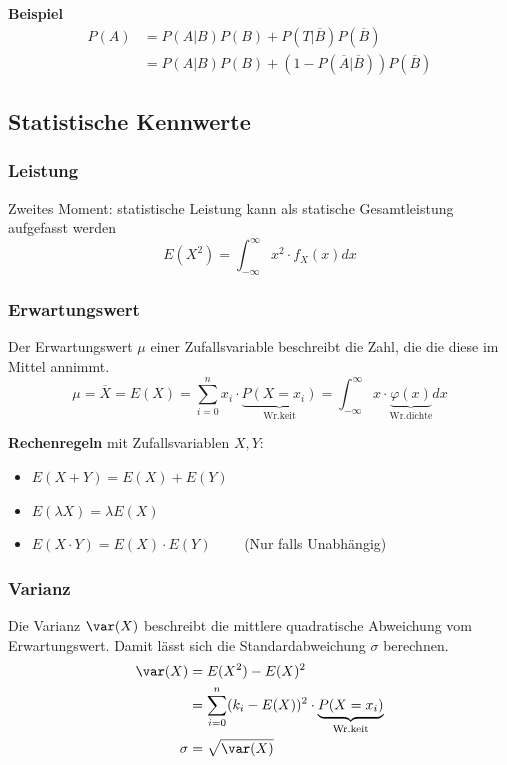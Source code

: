 \noindent\textbf{Beispiel}
\begin{align*}
	P(A) &=P(A|B)P(B) + P(T|\overline{B})P(\overline{B}) \\
	&= P(A|B)P(B) + (1 - P(\overline{A}|\overline{B}))P(\overline{B})
\end{align*}

\subsection{Statistische Kennwerte}
\subsubsection{Leistung}
Zweites Moment: statistische Leistung kann als statische Gesamtleistung aufgefasst werden
\[
E(X^2) = \int_{-\infty}^{\infty}x^2\cdot f_X(x)dx
\]

\subsubsection{Erwartungswert}
Der Erwartungswert $\mu$ einer Zufallsvariable beschreibt die Zahl, die die diese im Mittel annimmt.
\[
\mu = \overline{X} = E(X)= \sum\limits_{i=0}^{n}x_i\cdot \underbrace{P(X=x_i)}_\text{Wr.keit} = \int_{-\infty}^{\infty}x\cdot \underbrace{\varphi(x)}_{\text{Wr.dichte}}dx
\]

\textbf{Rechenregeln} mit Zufallsvariablen $X, Y$:
\begin{itemize}[nosep]
	\item $E(X + Y) = E(X) + E(Y)$
	\item $E(\lambda X) = \lambda E(X)$ 
	\item $E(X\cdot Y) = E(X) \cdot E(Y) \qquad$  (Nur falls Unabhängig)
\end{itemize}

\subsubsection{Varianz}
Die Varianz $\var(X)$ beschreibt die mittlere quadratische Abweichung vom Erwartungswert. Damit lässt sich die Standardabweichung $\sigma$ berechnen.
\begin{align*}
	\var(X) &= E(X^2) - E(X)^2 \\
	&=\sum\limits_{i=0}^{n}(k_i - E(X))^2 \cdot \underbrace{P(X=x_i)}_\text{Wr.keit} \\
	\sigma &= \sqrt{\var(X)}	
\end{align*}

